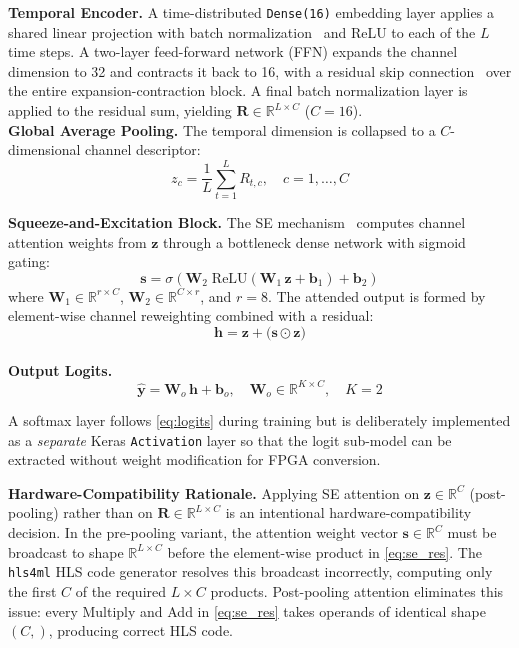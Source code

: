 \documentclass[12pt, letterpaper]{article}
\begin{document}
\noindent\textbf{Temporal Encoder.}\quad
A time-distributed \texttt{Dense(16)} embedding layer applies a shared
linear projection with batch normalization~\cite{Ioffe2015} and ReLU to
each of the $L$ time steps.
A two-layer feed-forward network (FFN)
expands the channel dimension to 32 and contracts it back to 16, with
a residual skip connection~\cite{He2016} over the entire expansion-contraction
block.
A final batch normalization layer is applied to the residual sum,
yielding $\mathbf{R} \in \mathbb{R}^{L \times C}$ ($C = 16$). \\
\noindent\textbf{Global Average Pooling.}\quad
The temporal dimension is collapsed to a $C$-dimensional channel
descriptor:
\begin{equation}
  z_c = \frac{1}{L}\sum_{t=1}^{L} R_{t,c}, \quad c = 1,\ldots,C
  \label{eq:gap}
\end{equation}

\noindent\textbf{Squeeze-and-Excitation Block.}\quad
The SE mechanism~\cite{Hu2018} computes channel attention weights from
$\mathbf{z}$ through a bottleneck dense network with sigmoid gating:
\begin{equation}
  \mathbf{s} = \sigma\!\left(
    \mathbf{W}_2\;\mathrm{ReLU}\!\left(
      \mathbf{W}_1\,\mathbf{z} + \mathbf{b}_1
    \right) + \mathbf{b}_2
  \right)
  \label{eq:se}
\end{equation}
where $\mathbf{W}_1 \in \mathbb{R}^{r \times C}$,
$\mathbf{W}_2 \in \mathbb{R}^{C \times r}$, and $r = 8$.
The attended output is formed by element-wise channel reweighting
combined with a residual:
\begin{equation}
  \mathbf{h} = \mathbf{z} + \bigl(\mathbf{s} \odot \mathbf{z}\bigr)
  \label{eq:se_res}
\end{equation} \\

\noindent\textbf{Output Logits.}\quad
\begin{equation}
  \hat{\mathbf{y}} = \mathbf{W}_o\,\mathbf{h} + \mathbf{b}_o,
  \quad \mathbf{W}_o \in \mathbb{R}^{K \times C},\quad K = 2
  \label{eq:logits}
\end{equation}

A softmax layer follows \eqref{eq:logits} during training but is
deliberately implemented as a \emph{separate} Keras
\texttt{Activation} layer so that the logit sub-model can be
extracted without weight modification for FPGA conversion.

\textbf{Hardware-Compatibility Rationale.}\quad
Applying SE attention on $\mathbf{z} \in \mathbb{R}^{C}$
(post-pooling) rather than on $\mathbf{R} \in \mathbb{R}^{L \times C}$
is an intentional hardware-compatibility decision.
In the
pre-pooling variant, the attention weight vector $\mathbf{s}
\in \mathbb{R}^{C}$ must be broadcast to shape
$\mathbb{R}^{L \times C}$ before the element-wise product in
\eqref{eq:se_res}.
The \texttt{hls4ml} HLS code generator resolves
this broadcast incorrectly, computing only the first $C$ of the
required $L \times C$ products.
Post-pooling attention eliminates
this issue: every Multiply and Add in \eqref{eq:se_res} takes
operands of identical shape $(C,)$, producing correct HLS code.
\end{document}
